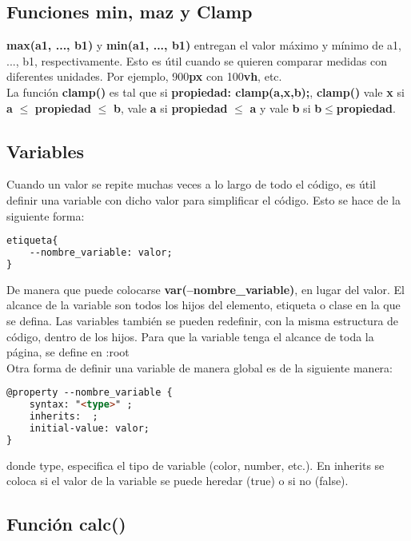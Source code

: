 \documentclass[10pt,oneside]{article}
\begin{document}
\begin{multicols}{2}
\subsection{ Funciones min, maz y Clamp}
    \textbf{max(a1, ..., b1)} y \textbf{min(a1, ..., b1)} entregan el valor máximo y mínimo de a1, ..., b1, respectivamente. Esto es útil cuando se quieren comparar medidas con diferentes unidades. Por ejemplo, 900\textbf{px} con 100\textbf{vh}, etc.\\ \newline La función \textbf{clamp()} es tal que si \textbf{propiedad: clamp(a,x,b);}, \textbf{clamp()} vale \textbf{x} si \textbf{a} $\leq$ \textbf{propiedad} $\leq$ \textbf{b}, vale \textbf{a} si \textbf{propiedad} $\leq$ \textbf{a} y vale \textbf{b} si \textbf{b}$\leq$\textbf{propiedad}.

\subsection{Variables}

    Cuando un valor se repite muchas veces a lo largo de todo el código, es útil definir una variable con dicho valor para simplificar el código. Esto se hace de la siguiente forma:

    \begin{lstlisting}[language=HTML]
etiqueta{
    --nombre_variable: valor;
}
    \end{lstlisting}

    De manera que puede colocarse \textbf{var(--nombre\_variable)}, en lugar del valor. El alcance de la variable son todos los hijos del elemento, etiqueta o clase en la que se defina. Las variables también se pueden redefinir, con la misma estructura de código, dentro de los hijos. Para que la variable tenga el alcance de toda la página, se define en :root \\\newline Otra forma de definir una variable de manera global es de la siguiente manera:

    \begin{lstlisting}[language=HTML]
@property --nombre_variable {
    syntax: "<type>" ;
    inherits:  ;
    initial-value: valor;
}
    \end{lstlisting}

    donde type, especifica el tipo de variable (color, number, etc.). En inherits se coloca si el valor de la variable se puede heredar (true) o si no (false).

\subsection{Función calc()} 


\end{multicols}
\end{document}
